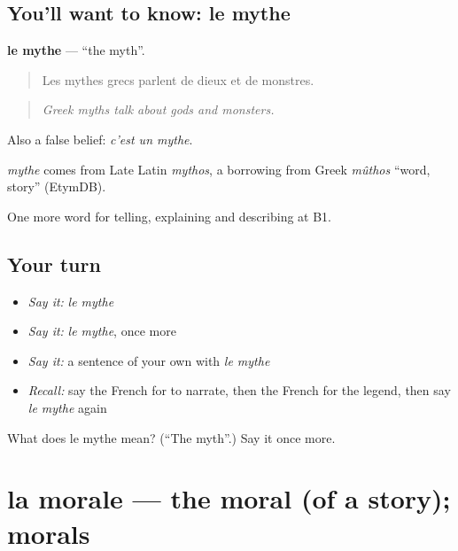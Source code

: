 \subsection*{You'll want to know: le mythe}
\textbf{le mythe} — \textquotedblleft{}the myth\textquotedblright{}.

\begin{quote}
Les mythes grecs parlent de dieux et de monstres.
\end{quote}

\begin{quote}
\emph{Greek myths talk about gods and monsters.}
\end{quote}

Also a false belief: \emph{c'est un mythe}.

\begin{cousinweb}
\emph{mythe} comes from Late Latin \emph{mythos}, a borrowing from Greek \emph{mûthos} \textquotedblleft{}word, story\textquotedblright{} (EtymDB).
\end{cousinweb}

\begin{grammarlens}[title={What you've built}]
One more word for telling, explaining and describing at B1.
\end{grammarlens}

\subsection*{Your turn}
\begin{itemize}
\raggedright
  \item \emph{Say it:} \emph{le mythe}
  \item \emph{Say it:} \emph{le mythe}, once more
  \item \emph{Say it:} a sentence of your own with \emph{le mythe}
  \item \emph{Recall:} say the French for to narrate, then the French for the legend, then say \emph{le mythe} again
\end{itemize}

\begin{tcolorbox}[breakable,colback=teal!4,colframe=teal!35!black,title={Before you move on}]
What does le mythe mean? (\textquotedblleft{}The myth\textquotedblright{}.) Say it once more.
\end{tcolorbox}
\section[la morale]{la morale — the moral (of a story); morals}

